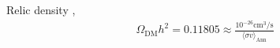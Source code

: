 Relic density \cite{1303.5076}, \cite{1607.02475}
\begin{align}
 \Omega_\text{DM} h^2 = 0.11805 \approx \frac{10^{-26} \text{cm}^3 / \text{s}}{ \langle \sigma v \rangle_\text{Ann}}
 \label{eq_boundAnn}
\end{align}


